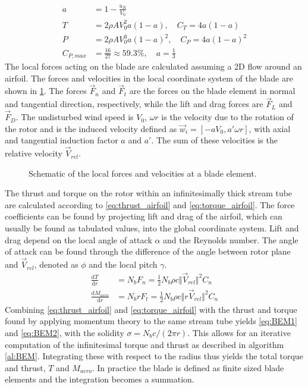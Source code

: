 \begin{align}
	a &= 1 - \frac{u_R}{V_0} \\
	T &= 2 \rho A V_0^2 a(1-a), \quad C_T = 4a(1-a) \label{eq:thrust2}\\
	P &= 2 \rho A V_0^3 a(1-a)^2, \quad C_P = 4a(1-a)^2 \label{eq:power2} \\
	C_{P,max} &= \frac{16}{27} \approx 59.3 \%, \quad a = \frac{1}{3} \label{eq:betz-limit}
\end{align}
The local forces acting on the blade are calculated assuming a 2D flow around an airfoil. The forces and velocities in the local coordinate system of the blade are shown in \ref{fig:airfoil}. The forces $\vec{F}_n$ and $\vec{F}_t$ are the forces on the blade element in normal and tangential direction, respectively, while the lift and drag forces are $\vec{F}_L$ and $\vec{F}_D$. The undisturbed wind speed is $V_0$, $\omega r$ is the velocity due to the rotation of the rotor and is the induced velocity defined as $\vec{w}_i = [-a V_0, a'\omega r]$, with axial and tangential induction factor $a$ and $a'$. The sum of these velocities is the relative velocity $\vec{V}_{rel}$. 
\begin{figure}[H]
	\centering
	\def\svgwidth{0.5 \textwidth}
	
	\caption{Schematic of the local forces and velocities at a blade element.}
	\label{fig:airfoil}
\end{figure} 
The thrust and torque on the rotor within an infinitesimally thick stream tube are calculated according to \eqref{eq:thrust_airfoil} and \eqref{eq:torque_airfoil}. The force coefficients can be found by projecting lift and drag of the airfoil, which can usually be found as tabulated values, into the global coordinate system. Lift and drag depend on the local angle of attack $\alpha$ and the Reynolds number. The angle of attack can be found through the difference of the angle between rotor plane and $\vec{V}_{rel}$, denoted as $\phi$ and the local pitch $\gamma$. 
\begin{align}
	\frac{\mathrm{d}T}{\mathrm{d}r} &=N_b F_n = \frac{1}{2}N_b \rho c \Vert \vec{V}_{rel} \Vert^2 C_n \label{eq:thrust_airfoil}\\
	\frac{\mathrm{d}M_{aero}}{\mathrm{d}r} &= N_b r F_t = \frac{1}{2} N_b\rho c \Vert r \vec{V}_{rel} \Vert^2 C_n \label{eq:torque_airfoil}
\end{align}
Combining \eqref{eq:thrust_airfoil} and \eqref{eq:torque_airfoil} with the thrust and torque found by applying momentum theory to the same stream tube yields \eqref{eq:BEM1} and \eqref{eq:BEM2}, with the solidity $\sigma = N_b c/(2 \pi r)$. This allows for an iterative computation of the infinitesimal torque and thrust as described in algorithm \ref{al:BEM}. Integrating these with respect to the radius thus yields the total torque and thrust, $T$ and $M_{aero}$. In practice the blade is defined as finite sized blade elements and the integration becomes a summation. \cite[p. 100 - 103]{sorensen_general_2016} \\
